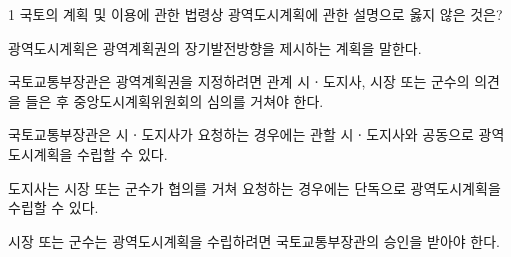 \begin{question}{1}
국토의 계획 및 이용에 관한 법령상 광역도시계획에 관한 설명으로 옳지 않은 것은?
\begin{choices}
  \item 광역도시계획은 광역계획권의 장기발전방향을 제시하는 계획을 말한다.
  \item 국토교통부장관은 광역계획권을 지정하려면 관계 시ㆍ도지사, 시장 또는 군수의 의견을 들은 후 중앙도시계획위원회의 심의를 거쳐야 한다.
  \item 국토교통부장관은 시ㆍ도지사가 요청하는 경우에는 관할 시ㆍ도지사와 공동으로 광역도시계획을 수립할 수 있다.
  \item 도지사는 시장 또는 군수가 협의를 거쳐 요청하는 경우에는 단독으로 광역도시계획을 수립할 수 있다.
  \item 시장 또는 군수는 광역도시계획을 수립하려면 국토교통부장관의 승인을 받아야 한다.
\end{choices}
\end{question}
